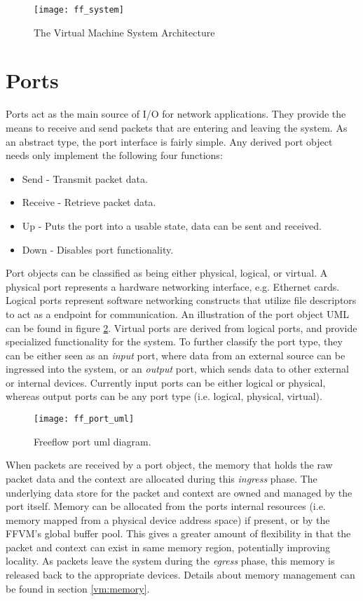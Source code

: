 \begin{figure}[h]
\centering
\texttt{[image: ff\_system]}
\caption{The Virtual Machine System Architecture}
\label{ff_system}
\end{figure}

\section{Ports}
\label{vm:port}
Ports act as the main source of I/O for network applications. They provide the
means to receive and send packets that are entering and leaving the system. As
an abstract type, the port interface is fairly simple. Any derived port object
needs only implement the following four functions:

\begin{itemize}
\item Send - Transmit packet data.
\item Receive - Retrieve packet data.
\item Up - Puts the port into a usable state, data can be sent and received.
\item Down - Disables port functionality.
\end{itemize}

Port objects can be classified as being either physical, logical, or virtual. A
physical port represents a hardware networking interface, e.g. Ethernet cards.
Logical ports represent software networking constructs that utilize file
descriptors to act as a endpoint for communication. An illustration of the port
object UML can be found in figure \ref{port_uml}. Virtual ports are derived
from logical ports, and provide specialized functionality for the system. To
further classify the port type, they can be either seen as an \emph{input}
port, where data from an external source can be ingressed into the system, or an
\emph{output} port, which sends data to other external or internal devices.
Currently input ports can be either logical or physical, whereas output ports
can be any port type (i.e. logical, physical, virtual).

\begin{figure}[h]
\centering
\texttt{[image: ff\_port\_uml]}
\caption{Freeflow port uml diagram.}
\label{port_uml}
\end{figure}

When packets are received by a port object, the memory that holds the raw
packet data and the context are allocated during this \emph{ingress} phase. The
underlying data store for the packet and context are owned and managed by the
port itself. Memory can be allocated from the ports internal resources (i.e.
memory mapped from a physical device address space) if present, or by the FFVM's
global buffer pool. This gives a greater amount of flexibility in that the
packet and context can exist in same memory region, potentially improving
locality. As packets leave the system during the \emph{egress} phase, this
memory is released back to the appropriate devices. Details about memory
management can be found in section \ref{vm:memory}.

